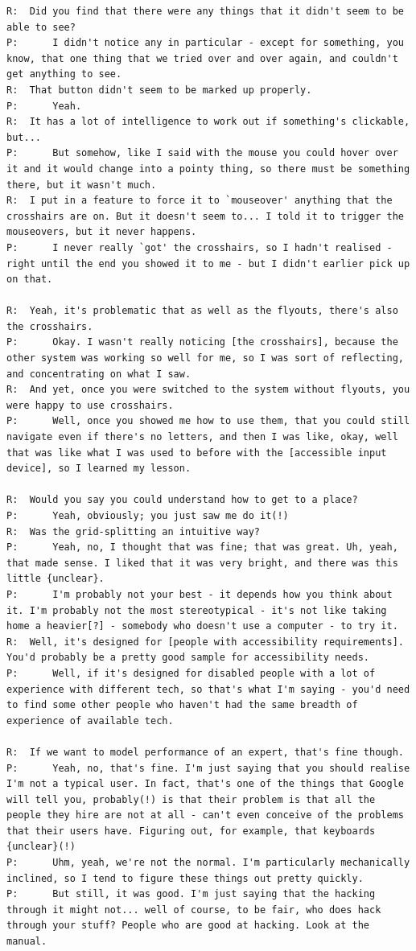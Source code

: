 \documentclass[a4paper, 12pt]{report}
\begin{document}
\begin{lstlisting}[caption={Transcript of Usability Study}, label={lst:usabilityTrans}, style=basic, language=custom, flexiblecolumns=true]
R:	Did you find that there were any things that it didn't seem to be able to see?
P:		I didn't notice any in particular - except for something, you know, that one thing that we tried over and over again, and couldn't get anything to see.
R:	That button didn't seem to be marked up properly.
P:		Yeah.
R:	It has a lot of intelligence to work out if something's clickable, but...
P:		But somehow, like I said with the mouse you could hover over it and it would change into a pointy thing, so there must be something there, but it wasn't much.
R:	I put in a feature to force it to `mouseover' anything that the crosshairs are on. But it doesn't seem to... I told it to trigger the mouseovers, but it never happens.
P:		I never really `got' the crosshairs, so I hadn't realised - right until the end you showed it to me - but I didn't earlier pick up on that.

R:	Yeah, it's problematic that as well as the flyouts, there's also the crosshairs.
P:		Okay. I wasn't really noticing [the crosshairs], because the other system was working so well for me, so I was sort of reflecting, and concentrating on what I saw.
R:	And yet, once you were switched to the system without flyouts, you were happy to use crosshairs.
P:		Well, once you showed me how to use them, that you could still navigate even if there's no letters, and then I was like, okay, well that was like what I was used to before with the [accessible input device], so I learned my lesson.

R:	Would you say you could understand how to get to a place?
P:		Yeah, obviously; you just saw me do it(!)
R:	Was the grid-splitting an intuitive way?
P:		Yeah, no, I thought that was fine; that was great. Uh, yeah, that made sense. I liked that it was very bright, and there was this little {unclear}.
P:		I'm probably not your best - it depends how you think about it. I'm probably not the most stereotypical - it's not like taking home a heavier[?] - somebody who doesn't use a computer - to try it.
R:	Well, it's designed for [people with accessibility requirements]. You'd probably be a pretty good sample for accessibility needs.
P:		Well, if it's designed for disabled people with a lot of experience with different tech, so that's what I'm saying - you'd need to find some other people who haven't had the same breadth of experience of available tech.

R:	If we want to model performance of an expert, that's fine though.
P:		Yeah, no, that's fine. I'm just saying that you should realise I'm not a typical user. In fact, that's one of the things that Google will tell you, probably(!) is that their problem is that all the people they hire are not at all - can't even conceive of the problems that their users have. Figuring out, for example, that keyboards {unclear}(!)
P:		Uhm, yeah, we're not the normal. I'm particularly mechanically inclined, so I tend to figure these things out pretty quickly.
P:		But still, it was good. I'm just saying that the hacking through it might not... well of course, to be fair, who does hack through your stuff? People who are good at hacking. Look at the manual.


\end{lstlisting}
\end{document}
